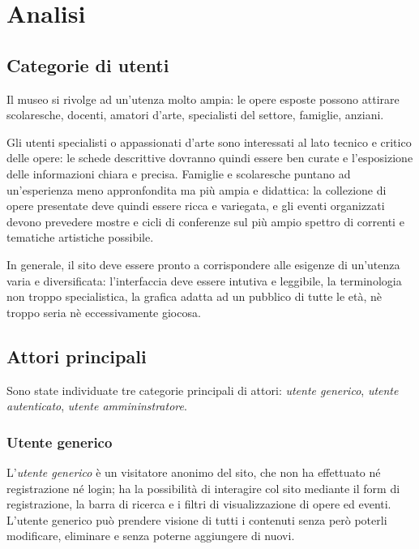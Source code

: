 \section{Analisi}
\label{analisi}

\subsection{Categorie di utenti}
\label{analisi-categorie-utenti}
Il museo si rivolge ad un'utenza molto ampia: le opere esposte possono attirare scolaresche, docenti, amatori d'arte, specialisti del settore, famiglie, anziani.

Gli utenti specialisti o appassionati d'arte sono interessati al lato tecnico e critico delle opere: le schede descrittive dovranno quindi essere ben curate e l'esposizione delle informazioni chiara e precisa. Famiglie e scolaresche puntano ad un'esperienza meno appronfondita ma più ampia e didattica: la collezione di opere presentate deve quindi essere ricca e variegata, e gli eventi organizzati devono prevedere mostre e cicli di conferenze sul più ampio spettro di correnti e tematiche artistiche possibile.

In generale, il sito deve essere pronto a corrispondere alle esigenze di un'utenza varia e diversificata: l'interfaccia deve essere intutiva e leggibile, la terminologia non troppo specialistica, la grafica adatta ad un pubblico di tutte le età, nè troppo seria nè eccessivamente giocosa.

\subsection{Attori principali}
\label{analisi-casi-uso-attori-principali}
Sono state individuate tre categorie principali di attori: \textit{utente generico}, \textit{utente autenticato}, \textit{utente ammininstratore}.

\subsubsection{Utente generico}
\label{analisi-casi-uso-attori-principali-utente-generico}
L'\textit{utente generico} è un visitatore anonimo del sito, che non ha effettuato né registrazione né login; ha la possibilità di interagire col sito mediante il form di registrazione, la barra di ricerca e i filtri di visualizzazione di opere ed eventi. L'utente generico può prendere visione di tutti i contenuti senza però poterli modificare, eliminare e senza poterne aggiungere di nuovi.

